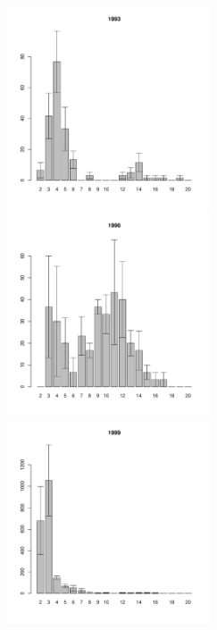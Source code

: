\documentclass[12pt, a4paper]{article}
\begin{document}
\begin{figure}[h]
\begin{multicols}{3}
\end{multicols}



\begin{multicols}{3}
\hfill
\includegraphics[width=60mm]{../White_Sea/Estuatiy_Luvenga/sizestr2_1993_.pdf}
\hfill
\includegraphics[width=60mm]{../White_Sea/Estuatiy_Luvenga/sizestr2_1996_.pdf}
\hfill
\includegraphics[width=60mm]{../White_Sea/Estuatiy_Luvenga/sizestr2_1999_.pdf}

\end{multicols}



\end{figure}
\end{document}
